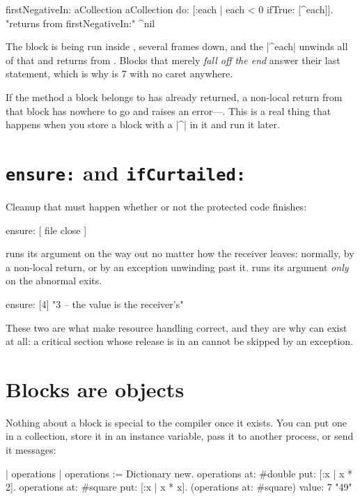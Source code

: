 \begin{st}
firstNegativeIn: aCollection
    aCollection do: [:each |
        each < 0 ifTrue: [^each]].       "returns from firstNegativeIn:"
    ^nil
\end{st}

The block is being run inside , several frames down, and the
\ct|^each| unwinds all of that and returns from
. Blocks that merely \emph{fall off the end} answer their
last statement, which is why  is 7 with no caret anywhere.

If the method a block belongs to has already returned, a non-local return from
that block has nowhere to go and raises an error---. This is
a real thing that happens when you store a block with a \ct|^| in it and
run it later.

\section{\texttt{ensure:} and \texttt{ifCurtailed:}}

Cleanup that must happen whether or not the protected code finishes:

\begin{st}
 ensure: [ file close ]
\end{st}

 runs its argument on the way out no matter how the receiver
leaves: normally, by a non-local return, or by an exception unwinding past it.
 runs its argument \emph{only} on the abnormal exits.

\begin{st}
[3] ensure: [4]                  "3 -- the value is the receiver's"
\end{st}

These two are what make resource handling correct, and they are why
 can exist at all: a critical section whose release is in an
 cannot be skipped by an exception.

\section{Blocks are objects}

Nothing about a block is special to the compiler once it exists. You can put
one in a collection, store it in an instance variable, pass it to another
process, or send it messages:

\begin{st}
| operations |
operations := Dictionary new.
operations at: #double put: [:x | x * 2].
operations at: #square put: [:x | x * x].
(operations at: #square) value: 7        "49"
\end{st}

